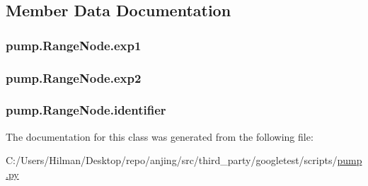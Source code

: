 \subsection{Member Data Documentation}
\hypertarget{classpump_1_1_range_node_acbb59f8c5e23d23563ca03f21574ce63}{}
\subsubsection[{exp1}]{\setlength{\rightskip}{0pt plus 5cm}pump.\+Range\+Node.\+exp1}\label{classpump_1_1_range_node_acbb59f8c5e23d23563ca03f21574ce63}
\hypertarget{classpump_1_1_range_node_afe153ee472b121652a51c62c1522cc13}{}
\subsubsection[{exp2}]{\setlength{\rightskip}{0pt plus 5cm}pump.\+Range\+Node.\+exp2}\label{classpump_1_1_range_node_afe153ee472b121652a51c62c1522cc13}
\hypertarget{classpump_1_1_range_node_ae75b9f31ba8c3bd048cf09b22035efa0}{}
\subsubsection[{identifier}]{\setlength{\rightskip}{0pt plus 5cm}pump.\+Range\+Node.\+identifier}\label{classpump_1_1_range_node_ae75b9f31ba8c3bd048cf09b22035efa0}


The documentation for this class was generated from the following file\+:\begin{DoxyCompactItemize}
\item 
C\+:/\+Users/\+Hilman/\+Desktop/repo/anjing/src/third\+\_\+party/googletest/scripts/\hyperlink{pump_8py}{pump.\+py}\end{DoxyCompactItemize}
